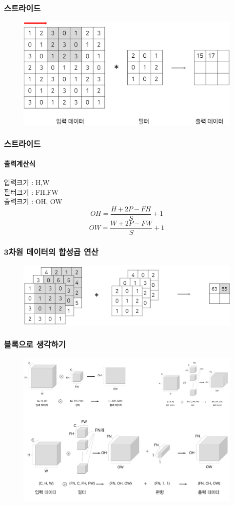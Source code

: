 \documentclass{beamer}
\begin{document}
\begin{frame}
	\frametitle{스트라이드}
	\begin{figure}
		\includegraphics[width=1\columnwidth]{../Figure/Figure_6.pdf}
	\end{figure}
\end{frame}

\begin{frame}
	\frametitle{스트라이드}
	\framesubtitle{출력계산식}
	입력크기 : H,W\\
	필터크기 : FH,FW\\
	출력크기 : OH, OW\\
	$$ OH = \dfrac{H+2P-FH}{S} + 1 $$
	$$ OW = \dfrac{W+2P-FW}{S} + 1 $$
\end{frame}

\begin{frame}
	\frametitle{3차원 데이터의 합성곱 연산}
	\begin{figure}
		\includegraphics[width=1\columnwidth]{../Figure/Figure_7.pdf}
	\end{figure}
\end{frame}

\begin{frame}
	\frametitle{블록으로 생각하기}
	\begin{figure}
		\includegraphics[width=0.8\columnwidth]{../Figure/Figure_8.pdf}
	\end{figure}
\end{frame}
\end{document}
